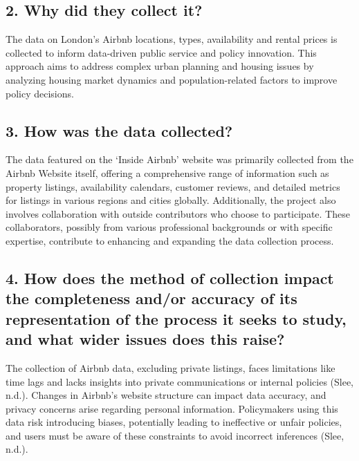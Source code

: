 \documentclass[
  letterpaper,
  DIV=11,
  numbers=noendperiod]{scrartcl}
\begin{document}
\hypertarget{why-did-they-collect-it}{%
\subsection{2. Why did they collect it?}\label{why-did-they-collect-it}}

The data on London's Airbnb locations, types, availability and rental
prices is collected to inform data-driven public service and policy
innovation. This approach aims to address complex urban planning and
housing issues by analyzing housing market dynamics and
population-related factors to improve policy decisions.

\hypertarget{how-was-the-data-collected}{%
\subsection{3. How was the data
collected?}\label{how-was-the-data-collected}}

The data featured on the `Inside Airbnb' website was primarily collected
from the Airbnb Website itself, offering a comprehensive range of
information such as property listings, availability calendars, customer
reviews, and detailed metrics for listings in various regions and cities
globally. Additionally, the project also involves collaboration with
outside contributors who choose to participate. These collaborators,
possibly from various professional backgrounds or with specific
expertise, contribute to enhancing and expanding the data collection
process.

\hypertarget{how-does-the-method-of-collection-impact-the-completeness-andor-accuracy-of-its-representation-of-the-process-it-seeks-to-study-and-what-wider-issues-does-this-raise}{%
\subsection{4. How does the method of collection impact the completeness
and/or accuracy of its representation of the process it seeks to study,
and what wider issues does this
raise?}\label{how-does-the-method-of-collection-impact-the-completeness-andor-accuracy-of-its-representation-of-the-process-it-seeks-to-study-and-what-wider-issues-does-this-raise}}

The collection of Airbnb data, excluding private listings, faces
limitations like time lags and lacks insights into private
communications or internal policies (Slee, n.d.). Changes in Airbnb's
website structure can impact data accuracy, and privacy concerns arise
regarding personal information. Policymakers using this data risk
introducing biases, potentially leading to ineffective or unfair
policies, and users must be aware of these constraints to avoid
incorrect inferences (Slee, n.d.).
\end{document}
